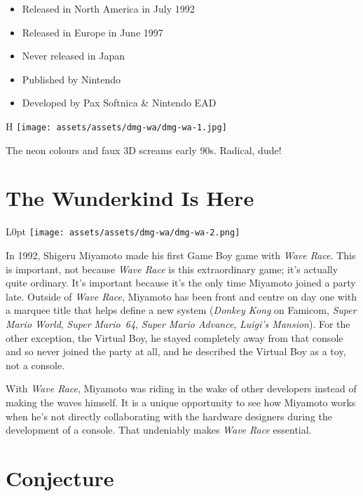 \documentclass{book}
\begin{document}
\begin{itemize} \setlength\itemsep{-0.4em}
\item Released in North America in July 1992
\item Released in Europe in June 1997
\item Never released in Japan
\item Published by Nintendo
\item Developed by Pax Softnica \& Nintendo EAD
\end{itemize}\noindent

\begin{wrapfigure}{H}{\linewidth}
\vskip 4pt
\centering \texttt{[image: assets/assets/dmg-wa/dmg-wa-1.jpg]}\par\pagetwodescription The neon colours and faux 3D screams early 90s. Radical, dude!\end{wrapfigure}
\clearpage

\FloatBarrier\needspace{10mm}\section*{The Wunderkind Is Here}\nopagebreak[4]

\begin{wrapfigure}{L}{0pt} \texttt{[image: assets/assets/dmg-wa/dmg-wa-2.png]}\end{wrapfigure}
In 1992, Shigeru Miyamoto made his first Game Boy game with \emph{Wave Race}. This is important, not because \emph{Wave Race} is this extraordinary game; it’s actually quite ordinary. It’s important because it’s the only time Miyamoto joined a party late. Outside of \emph{Wave Race}, Miyamoto has been front and centre on day one with a marquee title that helps define a new system (\emph{Donkey Kong} on Famicom, \emph{Super Mario World}, \emph{Super Mario 64}, \emph{Super Mario Advance}, \emph{Luigi’s Mansion}). For the other exception, the Virtual Boy, he stayed completely away from that console and so never joined the party at all, and he described the Virtual Boy as a toy, not a console.

With \emph{Wave Race}, Miyamoto was riding in the wake of other developers instead of making the waves himself. It is a unique opportunity to see how Miyamoto works when he’s not directly collaborating with the hardware designers during the development of a console. That undeniably makes \emph{Wave Race} essential.

\FloatBarrier\needspace{10mm}\section*{Conjecture}\nopagebreak[4]
\end{document}
